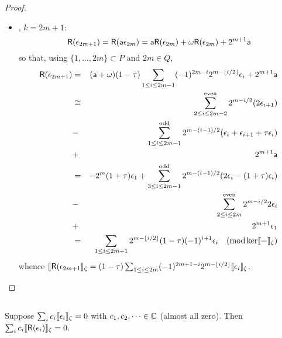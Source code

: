\begin{proof}
\begin{itemize}
\item\textbf{\claimA}, $k = 2m+1$:
\[
    \mathsf{R}(\epsilon_{2m+1}) = \mathsf{R}(\mathsf{a} \epsilon_{2m})
                = \mathsf{a} \mathsf{R}(\epsilon_{2m}) + \omega \mathsf{R}(\epsilon_{2m}) + 2^{m+1} \mathsf{a} 
\]
so that, using $\{1,\dots,2m\} \subset P$ and $2m \in Q$,
\begin{eqnarray*}
        \mathsf{R}(\epsilon_{2m+1}) &=& (\mathsf{a} + \omega) (1 - \tau) \sum_{1\le i\le 2m-1} (-1)^{2m-i} 2^{m - \lfloor i/2\rfloor} \epsilon_i + 2^{m+1} \mathsf{a}
                          \\&\cong& \sum_{2\le i\le 2m-2}^{\mathrm{even}} 2^{m - i/2} (2\epsilon_{i+1})
                          \\&-& \sum_{1\le i\le 2m-1}^{\mathrm{odd}} 2^{m - (i-1)/2} (\epsilon_i + \epsilon_{i+1} + \tau\epsilon_i)
                          \\&+& 2^{m+1} \mathsf{a}
                          \\&=& -2^m (1+\tau) \epsilon_1 + \sum_{3\le i\le 2m-1}^{\mathrm{odd}} 2^{m - (i-1)/2} (2\epsilon_i - (1+\tau)\epsilon_i)
                          \\&-& \sum_{2\le i\le 2m}^{\mathrm{even}} 2^{m - i/2} 2\epsilon_i
                          \\&+& 2^{m+1} \epsilon_1
                          \\&=& \sum_{1\le i\le 2m+1} 2^{m - \lfloor i/2\rfloor} (1-\tau) (-1)^{i+1} \epsilon_i\quad (\operatorname{\mathrm{mod}} \ker \llbracket{-}\rrbracket_\zeta)
\end{eqnarray*}
whence $\llbracket{\mathsf{R}(\epsilon_{2m+1}}\rrbracket_\zeta = (1-\tau) \sum_{1 \le i\le 2m} (-1)^{2m+1-i} 2^{m - \lfloor i/2\rfloor} \llbracket{\epsilon_i}\rrbracket_\zeta$. \qedhere
\end{itemize}\end{proof}

\subsection{}

\begin{lem}\label{lem:eps-rel} Suppose $\sum_i c_i \llbracket{\epsilon_i}\rrbracket_\zeta = 0$ with $c_1,c_2,\dots\in{\mathbb{C}}$ (almost all zero). Then
        $\sum_i c_i \llbracket{\mathsf{R}(\epsilon_i)}\rrbracket_\zeta  = 0$.
\end{lem}

